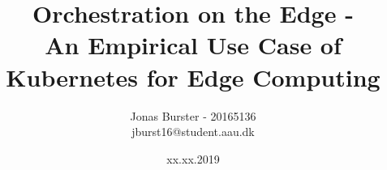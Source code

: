 \pagestyle{fancy}
\fancyhf{}
\title{Orchestration on the Edge -\\ An Empirical Use Case of Kubernetes for Edge Computing}
\author{Jonas Burster - 20165136\\jburst16@student.aau.dk}

\newcommand*{\currentname}{\@currentlabelname}
  \renewcommand{\chaptermark}[1]{%
  \markboth{#1}{}}

\date{xx.xx.2019}
\pagestyle{fancy}
\makeatletter
\let\runtitle\@title
\let\runauthor\@author
\makeatother
\lhead{\runtitle}



